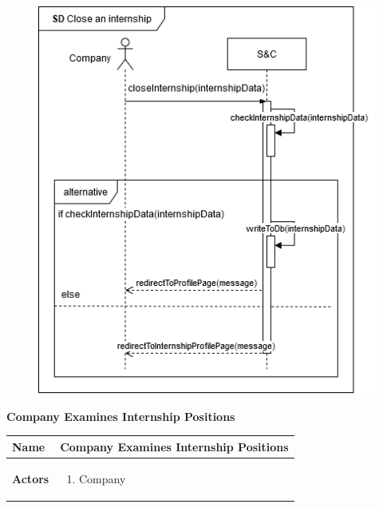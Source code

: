 \begin{enumerate}[label=\textbf{[US\arabic*]}, left = 0pt, align = left, resume]
            \newpage     
            \begin{figure}[h!]
                \centering  \includegraphics[width=1\textwidth]{RASD/Images/UseCases/US10_CloseInternship.drawio.png}
                \label{fig:example}
            \end{figure}
            
            \newpage
            \item \textbf{Company Examines Internship Positions} 
            \begin{longtable}{|l|p{11cm}|}  
                \hline
                \textbf{Name} & 
                    \textbf{Company Examines Internship Positions} \\
                \hline
                
                \textbf{Actors} & 
                    \begin{enumerate}[label=\textbullet, itemsep=0em]
                        \item Company
                    \end{enumerate} \\
                \hline
                

\end{longtable}
\end{enumerate}
